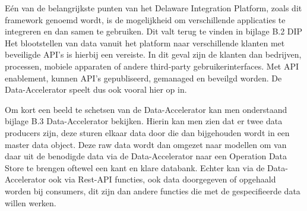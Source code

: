 Eén van de belangrijkste punten van het Delaware Integration Platform, zoals dit framework genoemd wordt, is de mogelijkheid om verschillende applicaties te integreren en dan samen te gebruiken. Dit valt terug te vinden in bijlage B.2 DIP Het blootstellen van data vanuit het platform naar verschillende klanten met beveiligde API's is hierbij een vereiste. In dit geval zijn de klanten dan bedrijven, processen, mobiele apparaten of andere third-party gebruikerinterfaces. Met API enablement, kunnen API's gepubliseerd, gemanaged en beveilgd worden. De Data-Accelerator speelt dus ook vooral hier op in.

Om kort een beeld te schetsen van de Data-Accelerator kan men onderstaand bijlage B.3 Data-Accelerator bekijken. Hierin kan men zien dat er twee data producers zijn, deze sturen elkaar data door die dan bijgehouden wordt in een master data object. Deze raw data wordt dan omgezet naar modellen om van daar uit de benodigde data via de Data-Accelerator naar een Operation Data Store te brengen oftewel een kant en klare databank. Echter kan via de Data-Accelerator ook via Rest-API functies, ook data doorgegeven of opgehaald worden bij consumers, dit zijn dan andere functies die met de gespecifieerde data willen werken.

